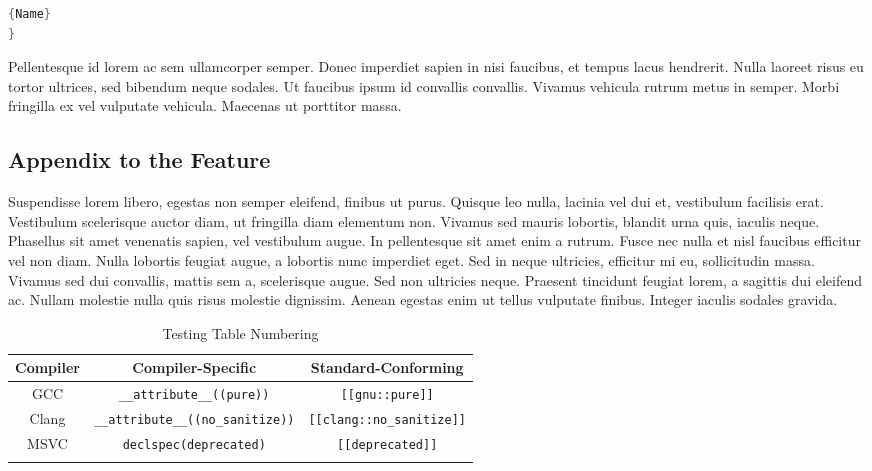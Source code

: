 {\begin{minipage}{.45\textwidth}
\begin{lstlisting}[language=C++, caption=code 2 with a long and wrapping title,frame=tb]{Name}
}
\end{lstlisting}
\end{minipage}

Pellentesque id lorem ac sem ullamcorper semper. Donec imperdiet sapien in nisi faucibus, et tempus lacus hendrerit. Nulla laoreet risus eu tortor ultrices, sed bibendum neque sodales. Ut faucibus ipsum id convallis convallis. Vivamus vehicula rutrum metus in semper. Morbi fringilla ex vel vulputate vehicula. Maecenas ut porttitor massa.

\subsection[Appendix to the Feature]{Appendix to the Feature}
Suspendisse lorem libero, egestas non semper eleifend, finibus ut purus. Quisque leo nulla, lacinia vel dui et, vestibulum facilisis erat. Vestibulum scelerisque auctor diam, ut fringilla diam elementum non. Vivamus sed mauris lobortis, blandit urna quis, iaculis neque. Phasellus sit amet venenatis sapien, vel vestibulum augue. In pellentesque sit amet enim a rutrum. Fusce nec nulla et nisl faucibus efficitur vel non diam. Nulla lobortis feugiat augue, a lobortis nunc imperdiet eget. Sed in neque ultricies, efficitur mi eu, sollicitudin massa. Vivamus sed dui convallis, mattis sem a, scelerisque augue. Sed non ultricies neque. Praesent tincidunt feugiat lorem, a sagittis dui eleifend ac. Nullam molestie nulla quis risus molestie dignissim. Aenean egestas enim ut tellus vulputate finibus. Integer iaculis sodales gravida.

\begin{table}[h!] 
\begin{center}
\begin{threeparttable}
\caption{Testing Table Numbering}\label{test-table1}\vspace{1.5ex} 
{\small \begin{tabular}{c|c|c}\thickhline 
\rowcolor[gray]{.9}   {\sffamily\bfseries Compiler} & {\sffamily\bfseries Compiler-Specific} &
{\sffamily\bfseries Standard-Conforming} \\ \hline 
GCC &\lstinline!__attribute__((pure))! & \lstinline![[gnu::pure]]! \\ \hline
Clang & \lstinline!__attribute__((no_sanitize))! &\lstinline![[clang::no_sanitize]]! \\ \hline 
MSVC & \lstinline!declspec(deprecated)! & \lstinline![[deprecated]]! \\ \thickhline
\end{tabular}
}
\end{threeparttable} 
\end{center}
\end{table}

}
